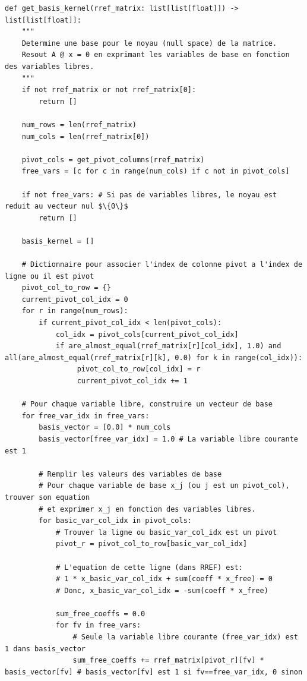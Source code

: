 \documentclass{report}
\begin{document}
\begin{verbatim}
def get_basis_kernel(rref_matrix: list[list[float]]) -> list[list[float]]:
    """
    Determine une base pour le noyau (null space) de la matrice.
    Resout A @ x = 0 en exprimant les variables de base en fonction des variables libres.
    """
    if not rref_matrix or not rref_matrix[0]:
        return []

    num_rows = len(rref_matrix)
    num_cols = len(rref_matrix[0])

    pivot_cols = get_pivot_columns(rref_matrix)
    free_vars = [c for c in range(num_cols) if c not in pivot_cols]

    if not free_vars: # Si pas de variables libres, le noyau est reduit au vecteur nul $\{0\}$
        return []

    basis_kernel = []

    # Dictionnaire pour associer l'index de colonne pivot a l'index de ligne ou il est pivot
    pivot_col_to_row = {}
    current_pivot_col_idx = 0
    for r in range(num_rows):
        if current_pivot_col_idx < len(pivot_cols):
            col_idx = pivot_cols[current_pivot_col_idx]
            if are_almost_equal(rref_matrix[r][col_idx], 1.0) and all(are_almost_equal(rref_matrix[r][k], 0.0) for k in range(col_idx)):
                 pivot_col_to_row[col_idx] = r
                 current_pivot_col_idx += 1

    # Pour chaque variable libre, construire un vecteur de base
    for free_var_idx in free_vars:
        basis_vector = [0.0] * num_cols
        basis_vector[free_var_idx] = 1.0 # La variable libre courante est 1

        # Remplir les valeurs des variables de base
        # Pour chaque variable de base x_j (ou j est un pivot_col), trouver son equation
        # et exprimer x_j en fonction des variables libres.
        for basic_var_col_idx in pivot_cols:
            # Trouver la ligne ou basic_var_col_idx est un pivot
            pivot_r = pivot_col_to_row[basic_var_col_idx]

            # L'equation de cette ligne (dans RREF) est:
            # 1 * x_basic_var_col_idx + sum(coeff * x_free) = 0
            # Donc, x_basic_var_col_idx = -sum(coeff * x_free)

            sum_free_coeffs = 0.0
            for fv in free_vars:
                # Seule la variable libre courante (free_var_idx) est 1 dans basis_vector
                sum_free_coeffs += rref_matrix[pivot_r][fv] * basis_vector[fv] # basis_vector[fv] est 1 si fv==free_var_idx, 0 sinon


\end{verbatim}
\end{document}
